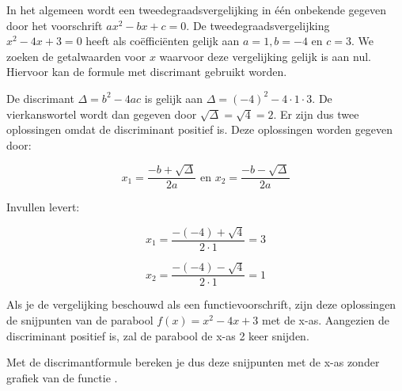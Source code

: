 \documentclass{ximera}
\begin{document}
\begin{exercise}
\begin{question}
\end{question}

\begin{oplossing}
            
In het algemeen wordt een tweedegraadsvergelijking in één onbekende gegeven door het voorschrift \(ax^2 - bx + c = 0\). 
De tweedegraadsvergelijking \(x^2 - 4x + 3 = 0\) heeft als coëfficiënten gelijk aan \(a = 1, b = -4 \text{ en } c = 3\). 
We zoeken de getalwaarden voor \(x\) waarvoor deze vergelijking gelijk is aan nul. 
Hiervoor kan de formule met discrimant gebruikt worden. 

\vspace{5mm}

De discrimant \( \Delta = b^2 - 4ac \) is gelijk aan \(\Delta = (-4)^2 -4\cdot 1 \cdot 3\). De vierkanswortel wordt dan gegeven door \(\sqrt{\Delta} = \sqrt{4} = 2\). Er zijn dus twee oplossingen omdat de discriminant positief is. Deze oplossingen worden gegeven door: 

\[
x_{1} = \frac{-b + \sqrt{\Delta}}{2a}  \text{ en }  x_{2} = \frac{-b - \sqrt{\Delta}}{2a}
\]

Invullen levert: 

\[
x_{1} = \frac{-(-4) + \sqrt{4}}{2\cdot 1}  = 3 
\]


\[
x_{2} = \frac{-(-4) - \sqrt{4}}{2\cdot 1}  = 1
\]
 

Als je de vergelijking beschouwd als een functievoorschrift, zijn deze oplossingen de snijpunten van de parabool \( f(x) = x^2 - 4x + 3 \) met de x-as. Aangezien de discriminant positief is, zal de parabool de x-as 2 keer snijden. 

\begin{image}
\end{image}

Met de discrimantformule bereken je dus deze snijpunten met de x-as zonder grafiek van de functie . 
\end{oplossing}
  
    
\end{exercise}
\end{document}
